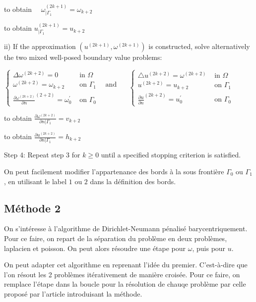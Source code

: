 to obtain $\quad \omega_{| \Gamma_{1}}^{(2 k+1)}=\omega_{k+2}$


to obtain $u_{| \Gamma_{1}}^{(2 k+1)}=u_{k+2}$


ii) If the approximation $\left(u^{(2 k+1)}, \omega^{(2 k+1)}\right)$ is constructed, solve alternatively
the two mixed well-posed boundary value problems:


$\left\{\begin{array}{ll}\Delta \omega^{(2 k+2)}=0 & \text { in } \Omega \\ \omega^{(2 k+2)}=\omega_{k+2} & \text { on } \Gamma_{1} \quad \text { and } \\ \frac{\partial \omega^{(2 k+2)}}{\partial n}^{(2+2)}=\omega_{0}^{\prime} & \text { on } \Gamma_{0}\end{array} \quad\left\{\begin{array}{ll}\triangle u^{(2 k+2)}=\omega^{(2 k+2)} & \text { in } \Omega \\ u^{(2 k+2)}=u_{k+2} & \text { on } \Gamma_{1} \\ \frac{\partial u}{\partial n}^{(2 k+2)}=u_{0}^{\prime} & \text { on } \Gamma_{0}\end{array}\right.\right.$


to obtain $\frac{\partial \omega^{(2 k+2)}}{\partial n | \Gamma_{1}}=v_{k+2}$


to obtain $\frac{\partial u^{(2 k+2)}}{\partial n | \Gamma_{1}}=h_{k+2}$


Step 4: Repeat step 3 for $k \geq 0$ until a specified stopping criterion is satisfied.



On peut facilement modifier l'appartenance des bords à la sous frontière $\Gamma_0$ ou  $\Gamma_1$, en utilisant le
label $1$ ou $2$ dans la définition des bords.


\subsection{Méthode 2}\label{subsec:méthode-2}
On s'intéresse à l'algorithme de Dirichlet-Neumann pénalisé barycentriquement.
Pour ce faire, on repart de la séparation du problème en deux problèmes, laplacien et poisson.
On peut alors résoudre une étape pour $\omega$, puis pour $u$.

On peut adapter cet algorithme en reprenant l'idée du premier.
C'est-à-dire que l'on résout les 2 problèmes itérativement de manière croisée.
Pour ce faire, on remplace l'étape dans la boucle pour la résolution de chauqe problème par celle proposé par
l'article introduisant la méthode.


